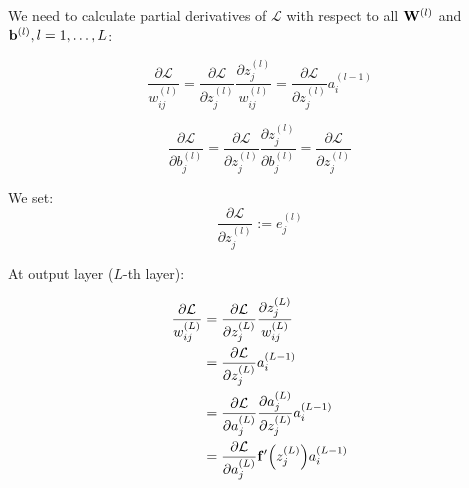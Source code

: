 \documentclass[14pt, a4paper]{article}
\numberwithin{equation}{section}
\numberwithin{algorithm}{section}
\numberwithin{figure}{section}
\begin{document}
We need to calculate partial derivatives of $\mathcal{L}$ with respect to all $\bold{W}^{(l)}$ and $\bold{b}^{(l)}, l=1, \dots, L$:

\begin{equation}
  \dfrac{\partial \mathcal{L}}{w_{ij}^{(l)}}=\dfrac{\partial \mathcal{L}}{\partial z_{j}^{(l)}}\dfrac{\partial z_j^{(l)}}{w_{ij}^{(l)}}=\dfrac{\partial \mathcal{L}}{\partial z_{j}^{(l)}}a_i^{(l-1)}
\end{equation}

\begin{equation}
  \dfrac{\partial \mathcal{L}}{\partial b_j^{(l)}}=\dfrac{\partial \mathcal{L}}{\partial z_{j}^{(l)}}\dfrac{\partial z_j^{(l)}}{\partial b_j^{(l)}}=\dfrac{\partial \mathcal{L}}{\partial z_{j}^{(l)}}
\end{equation}

We set:
\begin{equation}
	  \dfrac{\partial \mathcal{L}}{\partial z_{j}^{(l)}}:=e_j^{(l)}
\end{equation}

At output layer ($L$-th layer):

\begin{equation}
	\begin{aligned}
		\dfrac{\partial \mathcal{L}}{w_{ij}^{(L)}}&=\dfrac{\partial \mathcal{L}}{\partial z_{j}^{(L)}}\dfrac{\partial z_j^{(L)}}{w_{ij}^{(L)}}\\&=\dfrac{\partial \mathcal{L}}{\partial z_{j}^{(L)}}a_i^{(L-1)}\\&=\dfrac{\partial\mathcal{L}}{\partial a_j^{(L)}}\dfrac{\partial a_j^{(L)}}{\partial z_j^{(L)}}a_i^{(L-1)}\\&=\dfrac{\partial\mathcal{L}}{\partial a_j^{(L)}}\bold{f}^{\prime}\Big(z_j^{(L)}\Big)a_i^{(L-1)}
	\end{aligned}
\end{equation}
\end{document}
